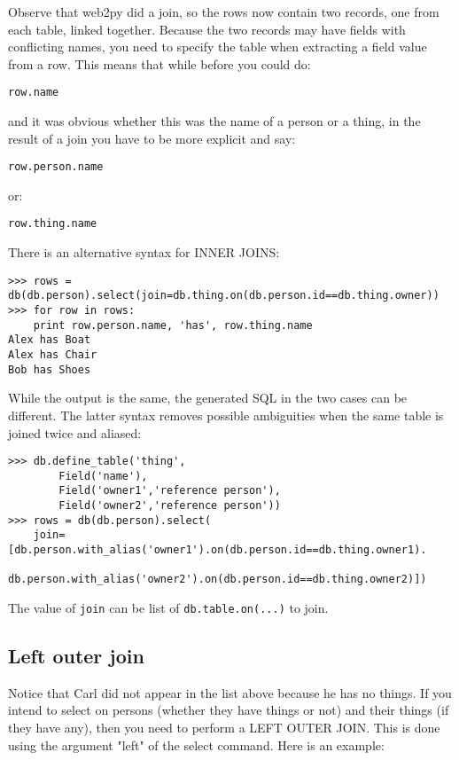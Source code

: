 \documentclass[justified,sixbynine,notoc]{tufte-book}
\def\ft{\small\tt}
\begin{document}
\begin{fullwidth}
Observe that web2py did a join, so the rows now contain two records, one from each table, linked together. Because the two records may have fields with conflicting names, you need to specify the table when extracting a field value from a row. This means that while before you could do:
\begin{lstlisting}
row.name
\end{lstlisting}
\noindent and it was obvious whether this was the name of a person or a thing, in the result of a join you have to be more explicit and say:
\begin{lstlisting}
row.person.name
\end{lstlisting}
\noindent or:
\begin{lstlisting}
row.thing.name
\end{lstlisting}

There is an alternative syntax for INNER JOINS:
\begin{lstlisting}
>>> rows = db(db.person).select(join=db.thing.on(db.person.id==db.thing.owner))
>>> for row in rows:
    print row.person.name, 'has', row.thing.name
Alex has Boat
Alex has Chair
Bob has Shoes
\end{lstlisting}

While the output is the same, the generated SQL in the two cases can be different. The latter syntax removes possible ambiguities when the same table is joined twice and aliased:

\begin{lstlisting}
>>> db.define_table('thing',
        Field('name'),
        Field('owner1','reference person'),
        Field('owner2','reference person'))
>>> rows = db(db.person).select(
    join=[db.person.with_alias('owner1').on(db.person.id==db.thing.owner1).
          db.person.with_alias('owner2').on(db.person.id==db.thing.owner2)])
\end{lstlisting}

The value of {\ft join} can be list of {\ft db.table.on(...)} to join.

\goodbreak\subsection{Left outer join}

Notice that Carl did not appear in the list above because he has no things. If you intend to select on persons (whether they have things or not) and their things (if they have any), then you need to perform a LEFT OUTER JOIN. This is done using the argument "left" of the select command. Here is an example:


\end{fullwidth}
\end{document}
